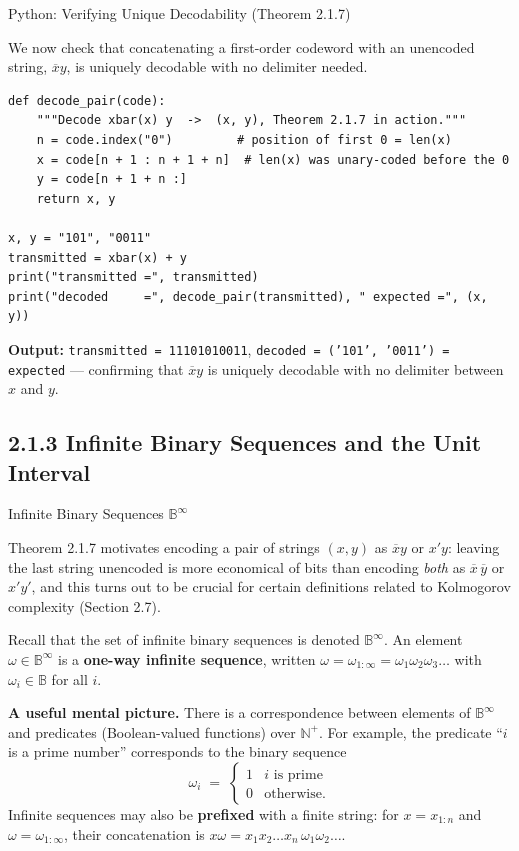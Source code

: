 \documentclass[aspectratio=169,10pt]{beamer}
\newcommand{\Binf}{\mathbb{B}^{\infty}}
\newcommand{\Bb}{\mathbb{B}}
\begin{document}
\begin{frame}[fragile]{Python: Verifying Unique Decodability (Theorem 2.1.7)}

We now check that concatenating a first-order codeword with an unencoded
string, $\overline{x}y$, is uniquely decodable with no delimiter needed.

\begin{lstlisting}
def decode_pair(code):
    """Decode xbar(x) y  ->  (x, y), Theorem 2.1.7 in action."""
    n = code.index("0")         # position of first 0 = len(x)
    x = code[n + 1 : n + 1 + n]  # len(x) was unary-coded before the 0
    y = code[n + 1 + n :]
    return x, y

x, y = "101", "0011"
transmitted = xbar(x) + y
print("transmitted =", transmitted)
print("decoded     =", decode_pair(transmitted), " expected =", (x, y))
\end{lstlisting}

\textbf{Output:} \texttt{transmitted = 11101010011},
\texttt{decoded = ('101', '0011') = expected} --- confirming that
$\overline{x}y$ is uniquely decodable with no delimiter between $x$ and
$y$.
\end{frame}

\subsection{2.1.3 Infinite Binary Sequences and the Unit Interval}

\begin{frame}{Infinite Binary Sequences $\Binf$}

Theorem 2.1.7 motivates encoding a pair of strings $(x,y)$ as $\overline{x}y$
or $x'y$: leaving the last string unencoded is more economical of bits than
encoding \emph{both} as $\overline{x}\,\overline{y}$ or $x'y'$, and this
turns out to be crucial for certain definitions related to Kolmogorov
complexity (Section 2.7).

\medskip
Recall that the set of infinite binary sequences is denoted $\Binf$. An
element $\omega\in\Binf$ is a \textbf{one-way infinite sequence}, written
$\omega=\omega_{1:\infty}=\omega_1\omega_2\omega_3\dots$ with $\omega_i\in\Bb$
for all $i$.

\medskip
\textbf{A useful mental picture.} There is a correspondence between
elements of $\Binf$ and predicates (Boolean-valued functions) over
$\mathbb{N}^+$. For example, the predicate ``$i$ is a prime number''
corresponds to the binary sequence
\[
  \omega_i \;=\;
  \begin{cases}
    1 & i\text{ is prime} \\
    0 & \text{otherwise.}
  \end{cases}
\]
Infinite sequences may also be \textbf{prefixed} with a finite string: for
$x=x_{1:n}$ and $\omega=\omega_{1:\infty}$, their concatenation is
$x\omega = x_1x_2\dots x_n\,\omega_1\omega_2\dots$.
\end{frame}
\end{document}
